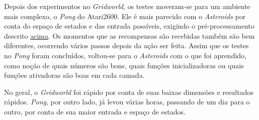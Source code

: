 Depois dos experimentos no \textit{Gridworld}, os testes moveram-se para um ambiente mais complexo, o \textit{Pong} do Atari2600.
Ele é mais parecido com o \textit{Asteroids} por conta do espaço de estados e das entrada possíveis, exigindo o pré-processamento descrito \hyperref[sec:arq]{acima}.
Os momentos que as recompensas são recebidas também são bem diferentes, ocorrendo vários passos depois da ação ser feita.
Assim que os testes no \textit{Pong} foram concluídos, voltou-se para o \textit{Asteroids} com o que foi aprendido, como noção de quais números são bons, quais funções inicializadoras ou quais funções ativadoras são boas em cada camada.

No geral, o \textit{Gridworld} foi rápido por conta de suas baixas dimensões e resultados rápidos.
\textit{Pong}, por outro lado, já levou várias horas, passando de um dia para o outro, por conta de sua maior entrada e espaço de estados.


